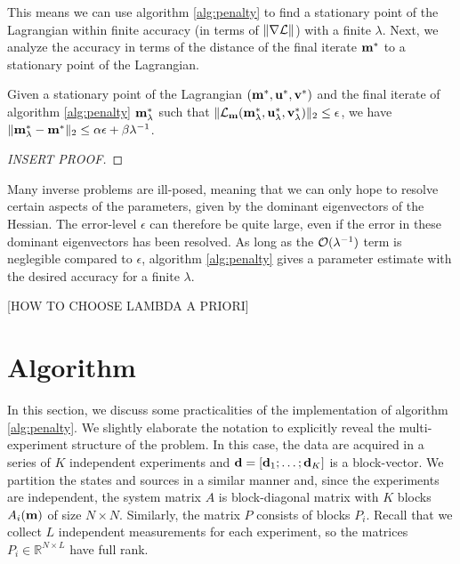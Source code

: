 \documentclass{iopart}
\begin{document}
This means we can use algorithm \ref{alg:penalty} to find a stationary point of the Lagrangian within finite accuracy (in terms of $\|\nabla\mathcal{L}\|$) with a finite $\lambda$. Next, we analyze the accuracy in terms of the distance of the final iterate $\mathbf{m}^*$ to a stationary point of the Lagrangian.

\begin{theorem}
Given a stationary point of the Lagrangian $(\mathbf{m}^*, \mathbf{u}^*, \mathbf{v}^*)$ and the final iterate of algorithm \ref{alg:penalty} $\mathbf{m}^*_{\lambda}$ such that $\|\mathcal{L}_{\mathbf{m}}(\mathbf{m}^*_{\lambda},\mathbf{u}^*_{\lambda},\mathbf{v}^*_{\lambda})\|_2 \leq \epsilon$, we have $\|\mathbf{m}^*_{\lambda} - \mathbf{m}^*\|_2 \leq \alpha\epsilon + \beta \lambda^{-1}$.
\end{theorem}
\begin{proof}
[INSERT PROOF]
\end{proof}
\begin{remark}
Many inverse problems are ill-posed, meaning that we can only hope to resolve certain aspects of the parameters, given by the dominant eigenvectors of the Hessian. The error-level $\epsilon$ can therefore be quite large, even if the error in these dominant  eigenvectors has been resolved. As long as the $\mathcal{O}(\lambda^{-1})$ term is neglegible compared to $\epsilon$, algorithm \ref{alg:penalty} gives a parameter estimate with the desired accuracy for a finite $\lambda$.
\end{remark}
[HOW TO CHOOSE LAMBDA A PRIORI]
\section{Algorithm}
\label{algorithm}
In this section, we discuss some practicalities of the implementation of algorithm \ref{alg:penalty}. We slightly elaborate the notation to explicitly 
reveal the multi-experiment structure of the problem. In this case, the data are acquired in a series of $K$ independent experiments and $\mathbf{d} = [\mathbf{d}_1; \ldots; \mathbf{d}_{K}]$ is a block-vector. We partition the states and sources in a similar manner and, since the experiments are independent, the system matrix $A$ is block-diagonal matrix with $K$ blocks $A_i(\mathbf{m})$ of size $N\times N$. Similarly, the matrix $P$ consists of blocks $P_i$. Recall that we collect $L$ independent measurements for each experiment, so the matrices $P_i\in\mathbb{R}^{N\times L}$ have full rank.
\end{document}
